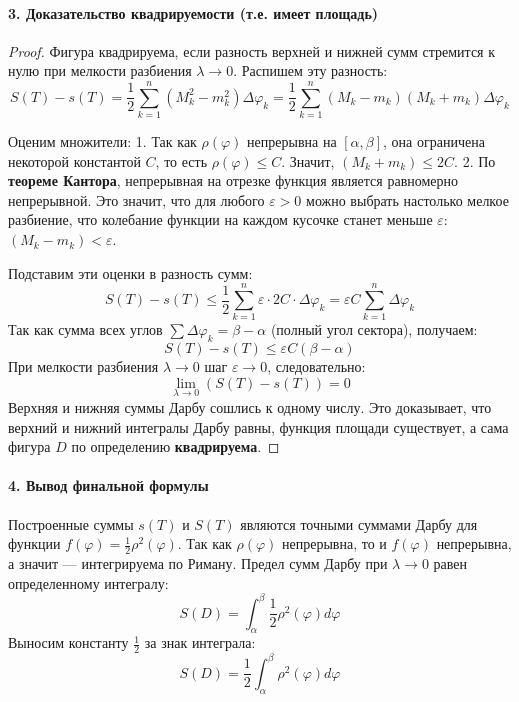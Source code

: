 \paragraph{3. Доказательство квадрируемости (т.е. имеет площадь)}
\begin{proof}
Фигура квадрируема, если разность верхней и нижней сумм стремится к нулю при мелкости разбиения $\lambda \to 0$. Распишем эту разность:
$$ S(T) - s(T) = \frac{1}{2} \sum_{k=1}^n (M_k^2 - m_k^2) \Delta \varphi_k = \frac{1}{2} \sum_{k=1}^n (M_k - m_k)(M_k + m_k) \Delta \varphi_k $$

Оценим множители:
1. Так как $\rho(\varphi)$ непрерывна на $[\alpha, \beta]$, она ограничена некоторой константой $C$, то есть $\rho(\varphi) \le C$. Значит, $(M_k + m_k) \le 2C$.
2. По \textbf{теореме Кантора}, непрерывная на отрезке функция является равномерно непрерывной. Это значит, что для любого $\varepsilon > 0$ можно выбрать настолько мелкое разбиение, что колебание функции на каждом кусочке станет меньше $\varepsilon$: $(M_k - m_k) < \varepsilon$.

Подставим эти оценки в разность сумм:
$$ S(T) - s(T) \le \frac{1}{2} \sum_{k=1}^n \varepsilon \cdot 2C \cdot \Delta \varphi_k = \varepsilon C \sum_{k=1}^n \Delta \varphi_k $$
Так как сумма всех углов $\sum \Delta \varphi_k = \beta - \alpha$ (полный угол сектора), получаем:
$$ S(T) - s(T) \le \varepsilon C (\beta - \alpha) $$
При мелкости разбиения $\lambda \to 0$ шаг $\varepsilon \to 0$, следовательно:
$$ \lim_{\lambda \to 0} (S(T) - s(T)) = 0 $$
Верхняя и нижняя суммы Дарбу сошлись к одному числу. Это доказывает, что верхний и нижний интегралы Дарбу равны, функция площади существует, а сама фигура $D$ по определению \textbf{квадрируема}.
\end{proof}

\paragraph{4. Вывод финальной формулы}
Построенные суммы $s(T)$ и $S(T)$ являются точными суммами Дарбу для функции $f(\varphi) = \frac{1}{2}\rho^2(\varphi)$. Так как $\rho(\varphi)$ непрерывна, то и $f(\varphi)$ непрерывна, а значит — интегрируема по Риману.
Предел сумм Дарбу при $\lambda \to 0$ равен определенному интегралу:
$$ S(D) = \int_{\alpha}^{\beta} \frac{1}{2} \rho^2(\varphi) d\varphi $$
Выносим константу $\frac{1}{2}$ за знак интеграла:
$$ S(D) = \frac{1}{2} \int_{\alpha}^{\beta} \rho^2(\varphi) d\varphi $$

